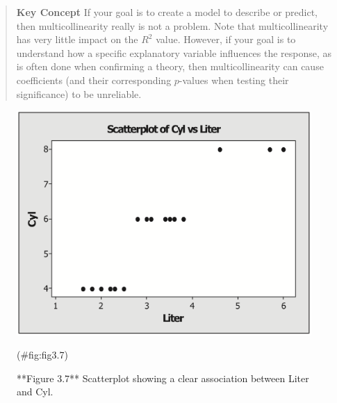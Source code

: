 \documentclass[
]{report}
\begin{document}
\begin{quote}
\textbf{Key Concept}
If your goal is to create a model to describe or predict, then multicollinearity really is not a problem. Note that multicollinearity has very little impact on the \(R^2\) value. However, if your goal is to understand how a specific explanatory variable influences the response, as is often done when confirming a theory, then multicollinearity can cause coefficients (and their corresponding \(p\)-values when testing their significance) to be unreliable.
\end{quote}

\begin{figure}

{\centering \includegraphics[width=1\linewidth]{docs/Fig3_7} 

}

\caption{**Figure 3.7** Scatterplot showing a clear association between Liter and Cyl.}(\#fig:fig3.7)
\end{figure}
\end{document}
